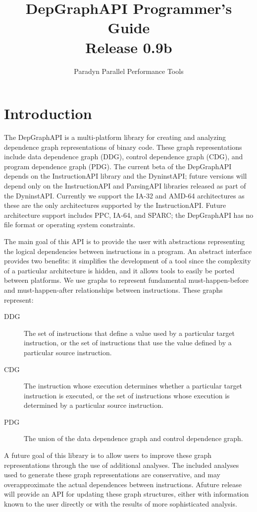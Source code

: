 \documentclass[12pt,titlepage]{article}
\begin{document}
\title{DepGraphAPI Programmer's Guide \\ Release 0.9b}
\author{Paradyn Parallel Performance Tools}
\maketitle
\tableofcontents
\section{Introduction}

The DepGraphAPI is a multi-platform library for creating and analyzing
dependence graph representations of binary code. These graph
representations include data dependence graph (DDG), control
dependence graph (CDG), and program dependence graph (PDG). The
current beta of the DepGraphAPI depends on the InstructionAPI library
and the DyninstAPI; future versions will depend only on the
InstructionAPI and ParsingAPI libraries released as part of the
DyninstAPI. Currently we support the IA-32 and AMD-64 architectures as
these are the only architectures supported by the
InstructionAPI. Future architecture support includes PPC, IA-64, and
SPARC; the DepGraphAPI has no file format or operating system
constraints.

The main goal of this API is to provide the user with abstractions
representing the logical dependencies between instructions in a
program. An abstract interface provides two benefits: it simplifies
the development of a tool since the complexity of a particular
architecture is hidden, and it allows tools to easily be ported
between platforms. We use graphs to represent fundamental
must-happen-before and must-happen-after relationships between
instructions. These graphs represent:
\begin{description}
\item[DDG] The set of instructions that define a value used by a
particular target instruction, or the set of instructions that use the
value defined by a particular source instruction.
\item[CDG] The instruction whose execution determines whether a
particular target instruction is executed, or the set of instructions
whose execution is determined by a particular source instruction.
\item[PDG] The union of the data dependence graph and control
dependence graph.
\end{description}

A future goal of this library is to allow users to improve these graph
representations through the use of additional analyses. The included
analyses used to generate these graph representations are
conservative, and may overapproximate the actual dependences between
instructions. Afuture release will provide an API for updating these
graph structures, either with information known to the user directly
or with the results of more sophisticated analysis.
\end{document}
